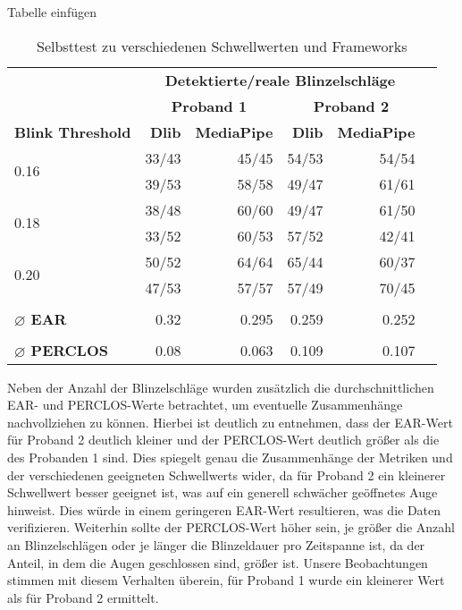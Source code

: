 Tabelle einfügen

\begin{table}[!htp]\centering
	\caption{Selbsttest zu verschiedenen Schwellwerten und Frameworks}\label{tab: }
	\scriptsize
	\begin{tabular}{lrrrrr}%
		&\multicolumn{4}{c}{\textbf{Detektierte/reale Blinzelschläge}} \\\cmidrule{2-5}
		&\multicolumn{2}{c}{\textbf{Proband 1}} &\multicolumn{2}{c}{\textbf{Proband 2}} \\\cmidrule{2-5}
		\textbf{Blink Threshold} &\textbf{Dlib} &\textbf{MediaPipe} &\textbf{Dlib} &\textbf{MediaPipe} \\\midrule
		\multirow{2}{*}{0.16} &33/43 &45/45 &54/53 &54/54 \\
		&39/53 &58/58 &49/47 &61/61 \\
		\multirow{2}{*}{0.18} &38/48 &60/60 &49/47 &61/50 \\
		&33/52 &60/53 &57/52 &42/41 \\
		\multirow{2}{*}{0.20} &50/52 &64/64 &65/44 &60/37 \\
		&47/53 &57/57 &57/49 &70/45 \\
		& & & & \\
		\textbf{$\varnothing$ EAR} &0.32 &0.295 &0.259 &0.252 \\
		& & & & \\
		\textbf{$\varnothing$ PERCLOS} &0.08 &0.063 &0.109 &0.107 \\
	\end{tabular}
\end{table}

Neben der Anzahl der Blinzelschläge wurden zusätzlich die durchschnittlichen EAR- und PERCLOS-Werte betrachtet, um eventuelle Zusammenhänge nachvollziehen zu können. Hierbei ist deutlich zu entnehmen, dass der EAR-Wert für Proband 2 deutlich kleiner und der PERCLOS-Wert deutlich größer als die des Probanden 1 sind. Dies spiegelt genau die Zusammenhänge der Metriken und der verschiedenen geeigneten Schwellwerts wider, da für Proband 2 ein kleinerer Schwellwert besser geeignet ist, was auf ein generell schwächer geöffnetes Auge hinweist. Dies würde in einem geringeren EAR-Wert resultieren, was die Daten verifizieren. Weiterhin sollte der PERCLOS-Wert höher sein, je größer die Anzahl an Blinzelschlägen oder je länger die Blinzeldauer pro Zeitspanne ist, da der Anteil, in dem die Augen geschlossen sind, größer ist. Unsere Beobachtungen stimmen mit diesem Verhalten überein, für Proband 1 wurde ein kleinerer Wert als für Proband 2 ermittelt.

